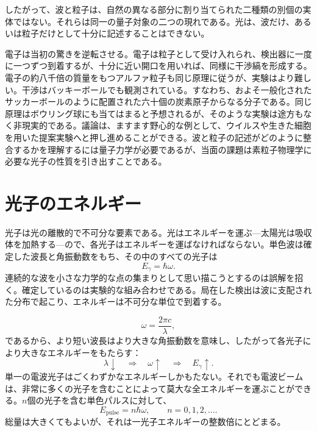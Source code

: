 したがって、波と粒子は、自然の異なる部分に割り当てられた二種類の別個の実体ではない。それらは同一の量子対象の二つの現れである。光は、波だけ、あるいは粒子だけとして十分に記述することはできない。

電子は当初の驚きを逆転させる。電子は粒子として受け入れられ、検出器に一度に一つずつ到着するが、十分に近い開口を用いれば、同様に干渉縞を形成する。電子の約八千倍の質量をもつアルファ粒子も同じ原理に従うが、実験はより難しい。干渉はバッキーボールでも観測されている。すなわち、およそ一般化されたサッカーボールのように配置された六十個の炭素原子からなる分子である。同じ原理はボウリング球にも当てはまると予想されるが、そのような実験は途方もなく非現実的である。議論は、ますます野心的な例として、ウイルスや生きた細胞を用いた提案実験へと押し進めることができる。波と粒子の記述がどのように整合するかを理解するには量子力学が必要であるが、当面の課題は素粒子物理学に必要な光子の性質を引き出すことである。

\section{光子のエネルギー}

光子は光の離散的で不可分な要素である。光はエネルギーを運ぶ---太陽光は吸収体を加熱する---ので、各光子はエネルギーを運ばなければならない。単色波は確定した波長と角振動数をもち、その中のすべての光子は
\begin{equation}
E_\gamma=\hbar\omega.
\end{equation}
連続的な波を小さな力学的な点の集まりとして思い描こうとするのは誤解を招く。確定しているのは実験的な組み合わせである。局在した検出は波に支配された分布で起こり、エネルギーは不可分な単位で到着する。

\begin{equation}
\omega=\frac{2\pi c}{\lambda},
\end{equation}
であるから、より短い波長はより大きな角振動数を意味し、したがって各光子により大きなエネルギーをもたらす：
\begin{equation}
\lambda\downarrow
\quad\Longrightarrow\quad
\omega\uparrow
\quad\Longrightarrow\quad
E_\gamma\uparrow.
\end{equation}
単一の電波光子はごくわずかなエネルギーしかもたない。それでも電波ビームは、非常に多くの光子を含むことによって莫大な全エネルギーを運ぶことができる。\(n\)個の光子を含む単色パルスに対して、
\begin{equation}
E_{\text{pulse}}=n\hbar\omega,
\qquad
n=0,1,2,\ldots.
\end{equation}
総量は大きくてもよいが、それは一光子エネルギーの整数倍にとどまる。

